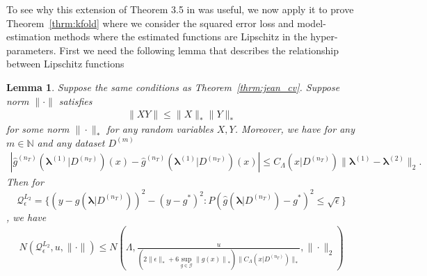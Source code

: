 \documentclass[10pt]{book}
\newtheorem{lemma}{Lemma}
\theoremstyle{definition}
\begin{document}
To see why this extension of Theorem 3.5 in \citet{lecue2012oracle} was useful, we now apply it to prove Theorem~\ref{thrm:kfold} where we consider the squared error loss and model-estimation methods where the estimated functions are Lipschitz in the hyper-parameters.
First we need the following lemma that describes the relationship between Lipschitz functions
\begin{lemma}
	Suppose the same conditions as Theorem~\ref{thrm:jean_cv}.
	Suppose norm $\|\cdot \|$ satisfies
	\begin{align}
	\| XY \| \le \|X\|_*\|Y\|_*
	\label{eq:cauchy-like}
	\end{align}
	for some norm $\|\cdot \|_*$ for any random variables $X,Y$.
	Moreover, we have for any $m \in \mathbb{N}$ and any dataset $D^{(m)}$
	\begin{align}
	\left |\hat{g}^{(n_T)}(\boldsymbol{\lambda}^{(1)}|D^{(n_T)})(x) - \hat{g}^{(n_T)}(\boldsymbol{\lambda}^{(1)}|D^{(n_T)})(x) \right | \le C_\Lambda(x|D^{(n_T)}) \|\boldsymbol{\lambda}^{(1)} - \boldsymbol{\lambda}^{(2)}\|_2.
	\end{align}
	Then for
	$$
	\mathcal{Q}_{\epsilon}^{L_2} = \{ 
	(y - \hat{g}(\boldsymbol{\lambda} | D^{(n_T)}))^2
	- (y - g^*)^2
	 : P (\hat{g}(\boldsymbol{\lambda} | D^{(n_T)}) - g^*)^2 \le \sqrt{\epsilon} \}
	 $$, we have
	\begin{align}
	N(\mathcal{Q}_{\epsilon}^{L_2}, u, \|\cdot \|)
	\le N \left (\Lambda, \frac{u}{\left (2 \|\epsilon\|_* + 6 \sup_{g \in \mathcal G} \left \|g(x) \right \|_* \right) \|C_\Lambda(x|D^{(n_T)})\|_*}, \|\cdot \|_{2} \right)
	\end{align}
	\label{lemma:covering_lipschitz}
\end{lemma}
\end{document}
